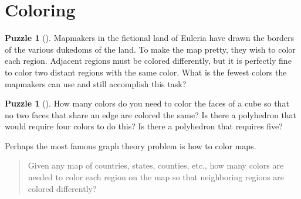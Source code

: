 \documentclass[10pt,]{book}
\theoremstyle{plain}
\theoremstyle{definition}
\theoremstyle{definition}
\theoremstyle{definition}
\newtheorem{investigation}[project]{Puzzle}
\numberwithin{equation}{chapter}
\begin{document}
\section[{Coloring}]{Coloring}\label{sec_coloring}
\begin{investigation}[]\label{investigation-6}
\hypertarget{p-332}{}%
Mapmakers in the fictional land of Euleria have drawn the borders of the various dukedoms of the land. To make the map pretty, they wish to color each region. Adjacent regions must be colored differently, but it is perfectly fine to color two distant regions with the same color. What is the fewest colors the mapmakers can use and still accomplish this task?%
\begin{sidebyside}{1}{0.25}{0.25}{0}
\begin{sbspanel}{0.5}
\end{sbspanel}
\end{sidebyside}
\end{investigation}
\begin{investigation}[]\label{investigation-7}
\hypertarget{p-333}{}%
How many colors do you need to color the faces of a cube so that no two faces that share an edge are colored the same?  Is there a polyhedron that would require four colors to do this?  Is there a polyhedron that requires five?%
\end{investigation}
\hypertarget{p-334}{}%
Perhaps the most famous graph theory problem is how to color maps.%
\begin{quote}\hypertarget{blockquote-2}{}
\hypertarget{p-335}{}%
Given any map of countries, states, counties, etc., how many colors are needed to color each region on the map so that neighboring regions are colored differently?%
\end{quote}
\end{document}
